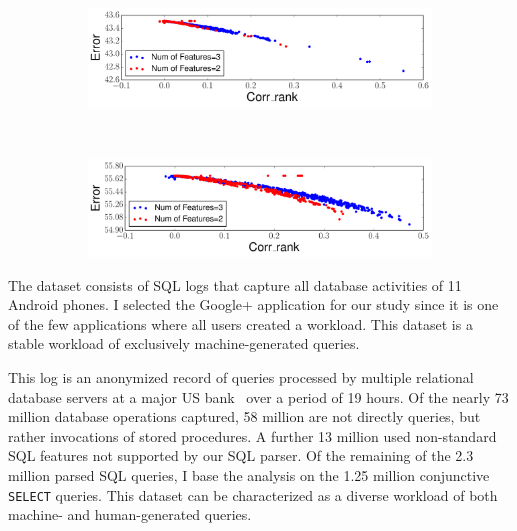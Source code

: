 \begin{figure}[h!]
\begin{subfigure}[b]{0.45\textwidth}
        \label{fig:errorcapturesKL_pocketdata}
\end{subfigure}
    ~
     \begin{subfigure}[b]{0.48\textwidth}
        \centering     \includegraphics[width=\textwidth]{QueryLogSummarization/graphics/ErrorCapturesCorrelation_BankData.pdf}
        \label{fig:errorcapturescorrelation_bankdata}
\end{subfigure}
    ~
     \begin{subfigure}[b]{0.48\textwidth}
        \centering     \includegraphics[width=\textwidth]{QueryLogSummarization/graphics/ErrorCapturesCorrelation_PocketData.pdf}
        \label{fig:errorcapturescorrelation_pocketdata}
\end{subfigure}
    
\label{fig:validatingencodingerror}
\trimfigurewhitespace
\end{figure}

The dataset consists of SQL logs that capture all database activities of 11 Android phones. 
I selected the Google+ application for our study since it is one of the few applications where all users created a workload. 
This dataset is a stable workload of exclusively machine-generated queries.

This log is an anonymized record of queries processed by multiple relational database servers at a major US bank~\cite{DBLP:conf/www/KulLXCCKU16} over a period of 19 hours.
Of the nearly 73 million database operations captured, 58 million are not directly queries, but rather invocations of stored procedures.
A further 13 million used non-standard SQL features not supported by our SQL parser. 
Of the remaining of the 2.3 million parsed SQL queries, I base the analysis on the 1.25 million conjunctive \texttt{SELECT} queries. 
This dataset can be characterized as a diverse workload of both machine- and human-generated queries.


